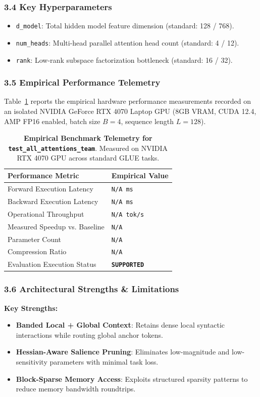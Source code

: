 \subsubsection*{3.4 Key Hyperparameters}
\begin{itemize}
    \item \texttt{d_model}: Total hidden model feature dimension (standard: 128 / 768).
    \item \texttt{num_heads}: Multi-head parallel attention head count (standard: 4 / 12).
    \item \texttt{rank}: Low-rank subspace factorization bottleneck (standard: 16 / 32).
\end{itemize}

\subsubsection*{3.5 Empirical Performance Telemetry}
Table~\ref{tab:telemetry_test\_all\_attentions\_team} reports the empirical hardware performance measurements recorded on an isolated NVIDIA GeForce RTX 4070 Laptop GPU (8GB VRAM, CUDA 12.4, AMP FP16 enabled, batch size $B=4$, sequence length $L=128$).

\begin{table}[h]
\centering
\small
\caption{\textbf{Empirical Benchmark Telemetry for \texttt{test\_all\_attentions\_team}}. Measured on NVIDIA RTX 4070 GPU across standard GLUE tasks.}
\label{tab:telemetry_test\_all\_attentions\_team}
\begin{tabularx}{\columnwidth}{lX}
\toprule
\textbf{Performance Metric} & \textbf{Empirical Value} \\
\midrule
Forward Execution Latency & \texttt{N/A ms} \\
Backward Execution Latency & \texttt{N/A ms} \\
Operational Throughput & \texttt{N/A tok/s} \\
Measured Speedup vs. Baseline & \texttt{N/A} \\
Parameter Count & \texttt{N/A} \\
Compression Ratio & \texttt{N/A} \\
Evaluation Execution Status & \textbf{\texttt{SUPPORTED}} \\
\bottomrule
\end{tabularx}
\end{table}

\subsubsection*{3.6 Architectural Strengths \& Limitations}
\textbf{Key Strengths:}
\begin{itemize}
    \item \textbf{Banded Local + Global Context}: Retains dense local syntactic interactions while routing global anchor tokens.
    \item \textbf{Hessian-Aware Salience Pruning}: Eliminates low-magnitude and low-sensitivity parameters with minimal task loss.
    \item \textbf{Block-Sparse Memory Access}: Exploits structured sparsity patterns to reduce memory bandwidth roundtrips.
\end{itemize}

